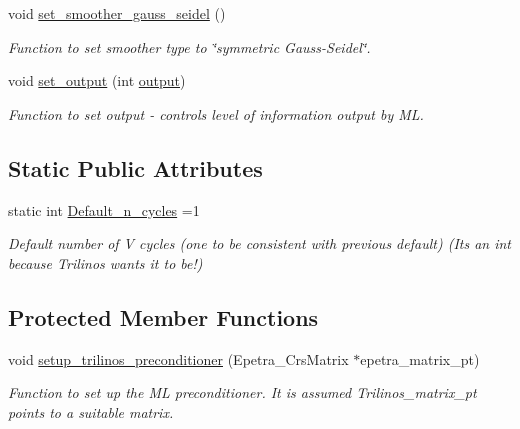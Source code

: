 \begin{DoxyCompactItemize}
void \hyperlink{classoomph_1_1TrilinosMLPreconditioner_a1482ae05644babd794e5a5079708ed79}{set\+\_\+smoother\+\_\+gauss\+\_\+seidel} ()
\begin{DoxyCompactList}\small\item\em Function to set smoother type to \char`\"{}symmetric Gauss-\/\+Seidel\char`\"{}. \end{DoxyCompactList}\item 
void \hyperlink{classoomph_1_1TrilinosMLPreconditioner_ae368c529ccddfe884ff0dd7a00401602}{set\+\_\+output} (int \hyperlink{namespaceoomph_a2473930e2634d673e2a3bed63b6851f0}{output})
\begin{DoxyCompactList}\small\item\em Function to set output -\/ controls level of information output by ML. \end{DoxyCompactList}\end{DoxyCompactItemize}
\subsection*{Static Public Attributes}
\begin{DoxyCompactItemize}
\item 
static int \hyperlink{classoomph_1_1TrilinosMLPreconditioner_a638b49c98a6afa2a4133038b42d6dea7}{Default\+\_\+n\+\_\+cycles} =1
\begin{DoxyCompactList}\small\item\em Default number of V cycles (one to be consistent with previous default) (It\textquotesingle{}s an int because Trilinos wants it to be!) \end{DoxyCompactList}\end{DoxyCompactItemize}
\subsection*{Protected Member Functions}
\begin{DoxyCompactItemize}
\item 
void \hyperlink{classoomph_1_1TrilinosMLPreconditioner_af3042313db1f0a5565bcd33ef36d2c6a}{setup\+\_\+trilinos\+\_\+preconditioner} (Epetra\+\_\+\+Crs\+Matrix $\ast$epetra\+\_\+matrix\+\_\+pt)
\begin{DoxyCompactList}\small\item\em Function to set up the ML preconditioner. It is assumed Trilinos\+\_\+matrix\+\_\+pt points to a suitable matrix. \end{DoxyCompactList}\end{DoxyCompactItemize}
